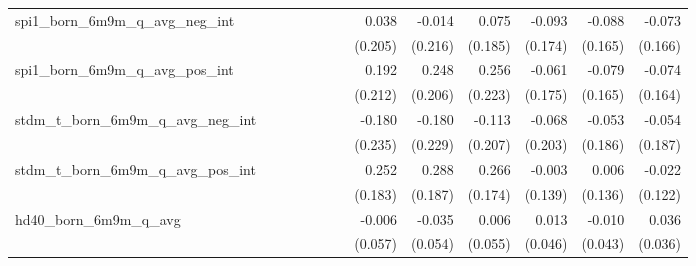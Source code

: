 \begin{tabular}{lrrrrrrrrrrrr}
spi1\_born\_6m9m\_q\_avg\_neg\_int          &              &              &              &              &              &              &        0.038 &       -0.014 &        0.075 &       -0.093 &       -0.088 &       -0.073 \\ 
                                            &              &              &              &              &              &              &      (0.205) &      (0.216) &      (0.185) &      (0.174) &      (0.165) &      (0.166) \\ 
spi1\_born\_6m9m\_q\_avg\_pos\_int          &              &              &              &              &              &              &        0.192 &        0.248 &        0.256 &       -0.061 &       -0.079 &       -0.074 \\ 
                                            &              &              &              &              &              &              &      (0.212) &      (0.206) &      (0.223) &      (0.175) &      (0.165) &      (0.164) \\ 
stdm\_t\_born\_6m9m\_q\_avg\_neg\_int       &              &              &              &              &              &              &       -0.180 &       -0.180 &       -0.113 &       -0.068 &       -0.053 &       -0.054 \\ 
                                            &              &              &              &              &              &              &      (0.235) &      (0.229) &      (0.207) &      (0.203) &      (0.186) &      (0.187) \\ 
stdm\_t\_born\_6m9m\_q\_avg\_pos\_int       &              &              &              &              &              &              &        0.252 &        0.288 &        0.266 &       -0.003 &        0.006 &       -0.022 \\ 
                                            &              &              &              &              &              &              &      (0.183) &      (0.187) &      (0.174) &      (0.139) &      (0.136) &      (0.122) \\ 
hd40\_born\_6m9m\_q\_avg                    &              &              &              &              &              &              &       -0.006 &       -0.035 &        0.006 &        0.013 &       -0.010 &        0.036 \\ 
                                            &              &              &              &              &              &              &      (0.057) &      (0.054) &      (0.055) &      (0.046) &      (0.043) &      (0.036) \\ 

\end{tabular}
